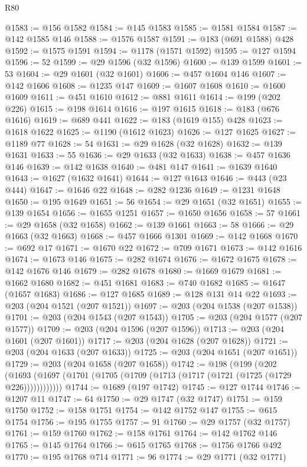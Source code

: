 \begin{lexlean}{R80}
\begin{coremodule}
@1583 := @156 @1582
@1584 := @145 @1583
@1585 := @1581 @1584
@1587 := @142 @1585 @146
@1588 := @1576 @1587
@1591 := @183 (@691 @1588) @428
@1592 := @1575 @1591
@1594 := @1178 (@1571 @1592)
@1595 := @127 @1594
@1596 := 52
@1599 := @29 @1596 (@32 @1596)
@1600 := @139 @1599
@1601 := 53
@1604 := @29 @1601 (@32 @1601)
@1606 := @457 @1604 @146
@1607 := @142 @1606
@1608 := @1235 @147
@1609 := @1607 @1608
@1610 := @1600 @1609
@1611 := @451 @1610
@1612 := @881 @1611
@1614 := @199 (@202 @226)
@1615 := @198 @1614
@1616 := @197 @1615
@1618 := @183 (@676 @1616)
@1619 := @689 @441
@1622 := @183 (@1619 @155) @428
@1623 := @1618 @1622
@1625 := @1190 (@1612 @1623)
@1626 := @127 @1625
@1627 := @1189 @77
@1628 := 54
@1631 := @29 @1628 (@32 @1628)
@1632 := @139 @1631
@1633 := 55
@1636 := @29 @1633 (@32 @1633)
@1638 := @457 @1636 @146
@1639 := @142 @1638
@1640 := @481 @147
@1641 := @1639 @1640
@1643 := @1627 (@1632 @1641)
@1644 := @127 @1643
@1646 := @443 (@23 @444)
@1647 := @1646 @22
@1648 := @282 @1236
@1649 := @1231 @1648
@1650 := @195 @1649
@1651 := 56
@1654 := @29 @1651 (@32 @1651)
@1655 := @139 @1654
@1656 := @1655 @1251
@1657 := @1650 @1656
@1658 := 57
@1661 := @29 @1658 (@32 @1658)
@1662 := @139 @1661
@1663 := 58
@1666 := @29 @1663 (@32 @1663)
@1668 := @457 @1666 @1301
@1669 := @142 @1668
@1670 := @692 @17
@1671 := @1670 @22
@1672 := @709 @1671
@1673 := @142 @1616
@1674 := @1673 @146
@1675 := @282 @1674
@1676 := @1672 @1675
@1678 := @142 @1676 @146
@1679 := @282 @1678
@1680 := @1669 @1679
@1681 := @1662 @1680
@1682 := @451 @1681
@1683 := @740 @1682
@1685 := @1647 (@1657 @1683)
@1686 := @127 @1685
@1689 := @128 @131 @14 @22
@1693 := @203 (@204 @1521 (@207 @1521))
@1697 := @203 (@204 @1538 (@207 @1538))
@1701 := @203 (@204 @1543 (@207 @1543))
@1705 := @203 (@204 @1577 (@207 @1577))
@1709 := @203 (@204 @1596 (@207 @1596))
@1713 := @203 (@204 @1601 (@207 @1601))
@1717 := @203 (@204 @1628 (@207 @1628))
@1721 := @203 (@204 @1633 (@207 @1633))
@1725 := @203 (@204 @1651 (@207 @1651))
@1729 := @203 (@204 @1658 (@207 @1658))
@1742 := @198
    (@199
      (@202 (@1693 (@1697 (@1701 (@1705 (@1709 (@1713 (@1717 (@1721 (@1725 (@1729 @226))))))))))))
@1744 := @1689 (@197 @1742)
@1745 := @127 @1744
@1746 := @1207 @11
@1747 := 64
@1750 := @29 @1747 (@32 @1747)
@1751 := @159 @1750
@1752 := @158 @1751
@1754 := @142 @1752 @147
@1755 := @615 @1754
@1756 := @195 @1755
@1757 := 91
@1760 := @29 @1757 (@32 @1757)
@1761 := @159 @1760
@1762 := @158 @1761
@1764 := @142 @1762 @146
@1765 := @145 @1764
@1766 := @615 @1765
@1768 := @1756 @1766 @492
@1770 := @195 @1768 @714
@1771 := 96
@1774 := @29 @1771 (@32 @1771)

\end{coremodule}
\end{lexlean}
